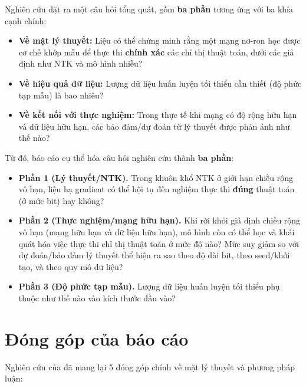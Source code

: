 Nghiên cứu đặt ra một câu hỏi tổng quát, gồm \textbf{ba phần} tương ứng với ba khía cạnh chính:
\begin{itemize}
    \item \textbf{Về mặt lý thuyết:} Liệu có thể chứng minh rằng một mạng nơ-ron học được cơ chế khớp mẫu để thực thi \textbf{chính xác} các chỉ thị thuật toán, dưới các giả định như NTK và mô hình nhiễu?
    \item \textbf{Về hiệu quả dữ liệu:} Lượng dữ liệu huấn luyện tối thiểu cần thiết (độ phức tạp mẫu) là bao nhiêu?
    \item \textbf{Về kết nối với thực nghiệm:} Trong thực tế khi mạng có độ rộng hữu hạn và dữ liệu hữu hạn, các bảo đảm/dự đoán từ lý thuyết được phản ánh như thế nào?
\end{itemize}


Từ đó, báo cáo cụ thể hóa câu hỏi nghiên cứu thành \textbf{ba phần}:

\begin{itemize}
    \item \textbf{Phần 1 (Lý thuyết/NTK).} Trong khuôn khổ NTK ở giới hạn chiều rộng vô hạn, liệu hạ gradient có thể hội tụ đến nghiệm thực thi \textbf{đúng} thuật toán (ở mức bit) hay không?
    \item \textbf{Phần 2 (Thực nghiệm/mạng hữu hạn).} Khi rời khỏi giả định chiều rộng vô hạn (mạng hữu hạn và dữ liệu hữu hạn), mô hình còn có thể học và khái quát hóa việc thực thi chỉ thị thuật toán ở mức độ nào? Mức suy giảm so với dự đoán/bảo đảm lý thuyết thể hiện ra sao theo độ dài bit, theo seed/khởi tạo, và theo quy mô dữ liệu?
    \item \textbf{Phần 3 (Độ phức tạp mẫu).} Lượng dữ liệu huấn luyện tối thiểu phụ thuộc như thế nào vào kích thước đầu vào?
\end{itemize}

\section{Đóng góp của báo cáo}

Nghiên cứu của đã mang lại 5 đóng góp chính về mặt lý thuyết và phương pháp luận:

